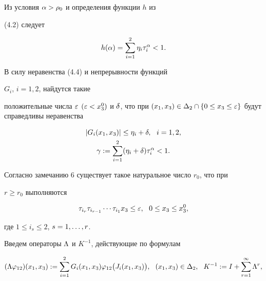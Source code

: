 \begin{pf}


Из условия $\alpha > \rho_0$ и определения функции $h$ из


(4.2) следует




\begin{equation}


h(\al)=\sum_{i=1}^2\eta_{i}{\tau}_i^{\al}<1.


\end{equation}


В силу неравенства (4.4) и непрерывности функций


$G_i$, $i=1,2$, найдутся такие


положительные числа $\ve$ $(\ve<x_3^0)$ и $\dl$, что при $(x_1,x_3) \in


\Delta_2 \cap \{0 \leq x_3 \leq \ve \}$ будут справедливы неравенства




\begin{gather}


|G_i(x_1,x_3)|\leq \eta_i+\dl,\ \ i=1,2,\\


\gamma:=\sum_{i=1}^2 (\eta_i+\dl)\tau_i^{\al}<1.


\end{gather}


Согласно замечанию 6 существует такое натуральное число $r_0$, что при


$r\geq r_0$ выполняются




\begin{equation}


{\tau}_{i_r}{\tau}_{i_{r-1}}\cd {\tau}_{i_1}x_3\leq \ve,\ \ 0\leq x_3\leq


x_3^0,


\end{equation}


где $1\leq i_s\leq 2$, $s=1,\dotsc,r$.





Введем операторы $\Lambda$ и $K^{-1}$, действующие по формулам


$$


(\Lb \vf_{12})(x_1,x_3):=\sum_{i=1}^2 G_i(x_1,x_3)\vf_{12}\big (J_i(x_1,x_3)


\big ),\ \ (x_1,x_3)\in \Delta_2,\ \ K^{-1}:=I+\sum_{r=1}^\iy \Lb^r,


$$



\end{pf}
